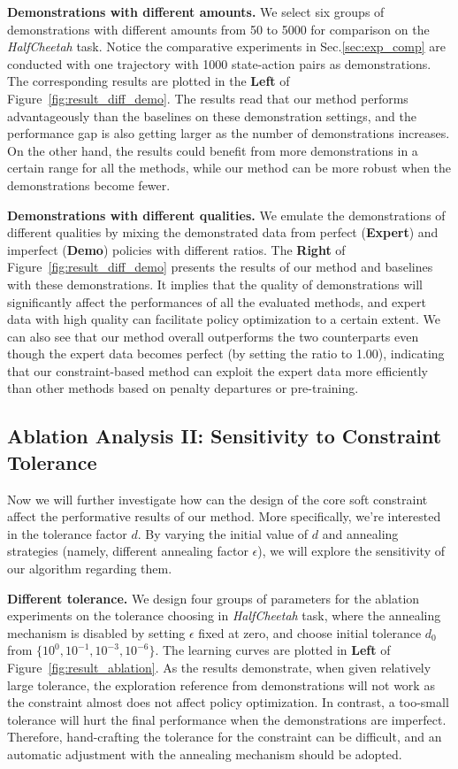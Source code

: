\documentclass[letterpaper]{article} %
\begin{document}
\noindent
\textbf{Demonstrations with different amounts.} We select six groups of demonstrations with different amounts from 50 to 5000 for comparison on the \textit{HalfCheetah} task. Notice the comparative experiments in Sec.\ref{sec:exp_comp} are conducted with one trajectory with 1000 state-action pairs as demonstrations. The corresponding results are plotted in the \textbf{Left} of Figure~\ref{fig:result_diff_demo}. The results read that our method performs advantageously than the baselines on these demonstration settings, and the performance gap is also getting larger as the number of demonstrations increases. On the other hand, the results could benefit from more demonstrations in a certain range for all the methods, while our method can be more robust when the demonstrations become fewer.

\noindent
\textbf{Demonstrations with different qualities.} We emulate the demonstrations of different qualities by mixing the demonstrated data from perfect (\textbf{Expert}) and imperfect (\textbf{Demo}) policies with different ratios. The \textbf{Right} of Figure~\ref{fig:result_diff_demo} presents the results of our method and baselines with these demonstrations. It implies that the quality of demonstrations will significantly affect the performances of all the evaluated methods, and expert data with high quality can facilitate policy optimization to a certain extent. We can also see that our method overall outperforms the two counterparts even though the expert data becomes perfect (by setting the ratio to 1.00), indicating that our constraint-based method can exploit the expert data more efficiently than other methods based on penalty departures or pre-training.

\subsection{Ablation Analysis II: Sensitivity to Constraint Tolerance}\label{sec:abla2}
Now we will further investigate how can the design of the core soft constraint affect the performative results of our method. More specifically, we're interested in the tolerance factor $d$. By varying the initial value of $d$ and annealing strategies (namely, different annealing factor $\epsilon$), we will explore the sensitivity of our algorithm regarding them.

\noindent
\textbf{Different tolerance.} We design four groups of parameters for the ablation experiments on the tolerance choosing in \textit{HalfCheetah} task, where the annealing mechanism is disabled by setting $\epsilon$ fixed at zero, and choose initial tolerance $d_0$ from $\{10^0,10^{-1},10^{-3},10^{-6}\}$. The learning curves are plotted in \textbf{Left} of Figure~\ref{fig:result_ablation}. As the results demonstrate, when given relatively large tolerance, the exploration reference from demonstrations will not work as the constraint almost does not affect policy optimization. In contrast, a too-small tolerance will hurt the final performance when the demonstrations are imperfect. Therefore, hand-crafting the tolerance for the constraint can be difficult, and an automatic adjustment with the annealing mechanism should be adopted.
\end{document}
